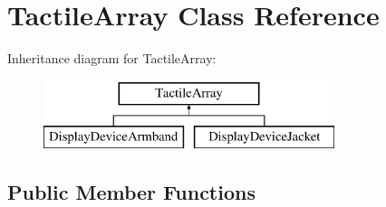 \hypertarget{classTactileArray}{
\section{TactileArray Class Reference}
\label{classTactileArray}
}
Inheritance diagram for TactileArray:\begin{figure}[H]
\begin{center}
\leavevmode
\includegraphics[height=2cm]{classTactileArray}
\end{center}
\end{figure}
\subsection*{Public Member Functions}
